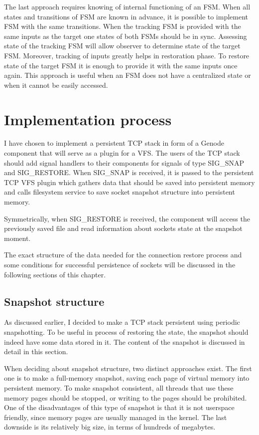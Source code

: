 The last approach requires knowing of internal functioning of an FSM. When all
states and transitions of FSM are known in advance, it is possible to implement
FSM with the same transitions. When the tracking FSM is provided with the same
inputs as the target one states of both FSMs should be in sync. Assessing state
of the tracking FSM will allow observer to determine state of the target FSM.
Moreover, tracking of inputs greatly helps in restoration phase. To restore
state of the target FSM it is enough to provide it with the same inputs once
again. This approach is useful when an FSM does not have a centralized state or
when it cannot be easily accessed.

\section{Implementation process}

I have chosen to implement a persistent TCP stack in form of a Genode component
that will serve as a plugin for a VFS. The users of the TCP stack should add
signal handlers to their components for signals of type SIG\_SNAP and
SIG\_RESTORE. When SIG\_SNAP is received, it is passed to the persistent TCP VFS
plugin which gathers data that should be saved into persistent memory and calls
filesystem service to save socket snapshot structure into persistent memory.

Symmetrically, when SIG\_RESTORE is received, the component will access the
previously saved file and read information about sockets state at the snapshot
moment.

The exact structure of the data needed for the connection restore process and
some conditions for successful persistence of sockets will be discussed in the
following sections of this chapter.

\subsection{Snapshot structure}

As discussed earlier, I decided to make a TCP stack persistent using periodic
snapshotting.  To be useful in process of restoring the state, the snapshot
should indeed have some data stored in it. The content of the snapshot is
discussed in detail in this section.

When deciding about snapshot structure, two distinct approaches exist. The first one is to make a full-memory snapshot, saving each page of virtual
memory into persistent memory. To make snapshot consistent, all threads that use
these memory pages should be stopped, or writing to the pages should be
prohibited.  One of the disadvantages of this type of snapshot is that it is not userspace
friendly, since memory pages are usually managed in the kernel. The last
downside is its relatively big size, in terms of hundreds of megabytes. 

